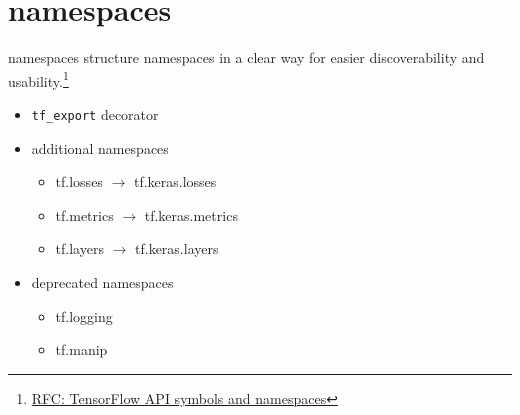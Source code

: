 
\section{namespaces}

\begin{frame}{namespaces}
    structure namespaces in a clear way for easier discoverability and usability.\footnote{\href{https://github.com/tensorflow/community/pull/16}{RFC: TensorFlow API symbols and namespaces}}

    \begin{itemize}
        \item \lstinline{tf_export} decorator
        \item additional namespaces
            \begin{itemize}
                \item tf.losses $\to$ tf.keras.losses
                \item tf.metrics $\to$ tf.keras.metrics
                \item tf.layers $\to$ tf.keras.layers
            \end{itemize}
        \item deprecated namespaces
            \begin{itemize}
                \item tf.logging
                \item tf.manip
            \end{itemize}
    \end{itemize}
\end{frame}
